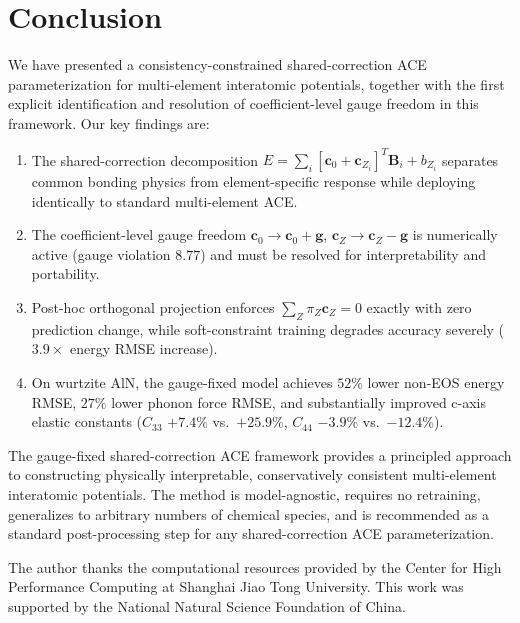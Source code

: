 \documentclass[twoside,prb,aps,floatfix,superscriptaddress,longbibliography]{revtex4-2}
\begin{document}
\section{Conclusion}
\label{sec:conclusion}

We have presented a consistency-constrained shared-correction ACE parameterization for multi-element interatomic potentials, together with the first explicit identification and resolution of coefficient-level gauge freedom in this framework. Our key findings are:

\begin{enumerate}[label=\textbf{(F\arabic*)}]
    \item The shared-correction decomposition $E = \sum_i [\mathbf{c}_0 + \mathbf{c}_{Z_i}]^T \mathbf{B}_i + b_{Z_i}$ separates common bonding physics from element-specific response while deploying identically to standard multi-element ACE.
    \item The coefficient-level gauge freedom $\mathbf{c}_0 \to \mathbf{c}_0 + \mathbf{g}$, $\mathbf{c}_Z \to \mathbf{c}_Z - \mathbf{g}$ is numerically active (gauge violation $8.77$) and must be resolved for interpretability and portability.
    \item Post-hoc orthogonal projection enforces $\sum_Z \pi_Z \mathbf{c}_Z = 0$ exactly with zero prediction change, while soft-constraint training degrades accuracy severely ($3.9\times$ energy RMSE increase).
    \item On wurtzite AlN, the gauge-fixed model achieves $52\%$ lower non-EOS energy RMSE, $27\%$ lower phonon force RMSE, and substantially improved c-axis elastic constants ($C_{33}$ $+7.4\%$ vs.\ $+25.9\%$, $C_{44}$ $-3.9\%$ vs.\ $-12.4\%$).
\end{enumerate}

The gauge-fixed shared-correction ACE framework provides a principled approach to constructing physically interpretable, conservatively consistent multi-element interatomic potentials. The method is model-agnostic, requires no retraining, generalizes to arbitrary numbers of chemical species, and is recommended as a standard post-processing step for any shared-correction ACE parameterization.

\begin{acknowledgments}
The author thanks the computational resources provided by the Center for High Performance Computing at Shanghai Jiao Tong University. This work was supported by the National Natural Science Foundation of China.
\end{acknowledgments}
\end{document}
